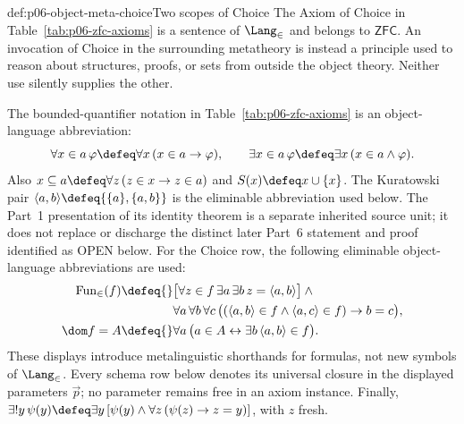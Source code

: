 \begin{hbwarning}{def:p06-object-meta-choice}{Two scopes of Choice}
The Axiom of Choice in Table~\ref{tab:p06-zfc-axioms} is a sentence of
\(\Lang_{\in}\) and belongs to \(\mathsf{ZFC}\).  An invocation of Choice in
the surrounding metatheory is instead a principle used to reason about
structures, proofs, or sets from outside the object theory.  Neither use
silently supplies the other.
\end{hbwarning}

The bounded-quantifier notation in Table~\ref{tab:p06-zfc-axioms} is an
object-language abbreviation:
\[
 \forall x\in a\,\varphi\defeq\forall x\,(x\in a\to\varphi),
 \qquad
 \exists x\in a\,\varphi\defeq\exists x\,(x\in a\land\varphi).
\]
Also
\(x\subseteq a\defeq\forall z\,(z\in x\to z\in a)\) and
\(S(x)\defeq x\cup\{x\}\).  The Kuratowski pair
\(\langle a,b\rangle\defeq\{\{a\},\{a,b\}\}\) is the eliminable abbreviation
used below.  The Part~1 presentation of its identity theorem is a separate
inherited source unit; it does not replace or discharge the distinct later
Part~6 statement and proof identified as OPEN below.  For the Choice row, the
following eliminable object-language abbreviations are used:
\[
\begin{aligned}
 \operatorname{Fun}_{\in}(f)\defeq{}&
   \bigl[\forall z\in f\,\exists a\,\exists b\,
          z=\langle a,b\rangle\bigr]\land{}\\
 &\forall a\,\forall b\,\forall c\,
   \bigl((\langle a,b\rangle\in f\land
          \langle a,c\rangle\in f)\to b=c\bigr),\\
 \dom f=A\defeq{}&
   \forall a\,
   \bigl(a\in A\leftrightarrow
         \exists b\,\langle a,b\rangle\in f\bigr).
\end{aligned}
\]
These displays introduce metalinguistic shorthands for formulas, not new
symbols of \(\Lang_{\in}\).  Every schema row below denotes its universal
closure in the displayed parameters \(\vec p\); no parameter remains free in
an axiom instance.  Finally,
\(\exists!y\,\psi(y)\defeq
\exists y\,[\psi(y)\land\forall z\,(\psi(z)\to z=y)]\), with \(z\) fresh.

